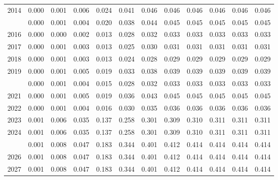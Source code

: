 \documentclass[
]{article}
\begin{document}
\begin{longtable}[t]{lrrrrrrrrrrr}
2014 & 0.000 & 0.001 & 0.006 & 0.024 & 0.041 & 0.046 & 0.046 & 0.046 & 0.046 & 0.046 & 0.046\\
\addlinespace
2015 & 0.000 & 0.001 & 0.004 & 0.020 & 0.038 & 0.044 & 0.045 & 0.045 & 0.045 & 0.045 & 0.045\\
2016 & 0.000 & 0.000 & 0.002 & 0.013 & 0.028 & 0.032 & 0.033 & 0.033 & 0.033 & 0.033 & 0.033\\
2017 & 0.000 & 0.001 & 0.003 & 0.013 & 0.025 & 0.030 & 0.031 & 0.031 & 0.031 & 0.031 & 0.031\\
2018 & 0.000 & 0.001 & 0.003 & 0.013 & 0.024 & 0.028 & 0.029 & 0.029 & 0.029 & 0.029 & 0.029\\
2019 & 0.000 & 0.001 & 0.005 & 0.019 & 0.033 & 0.038 & 0.039 & 0.039 & 0.039 & 0.039 & 0.039\\
\addlinespace
2020 & 0.000 & 0.001 & 0.004 & 0.015 & 0.028 & 0.032 & 0.033 & 0.033 & 0.033 & 0.033 & 0.033\\
2021 & 0.000 & 0.001 & 0.005 & 0.019 & 0.036 & 0.043 & 0.045 & 0.045 & 0.045 & 0.045 & 0.045\\
2022 & 0.000 & 0.001 & 0.004 & 0.016 & 0.030 & 0.035 & 0.036 & 0.036 & 0.036 & 0.036 & 0.036\\
2023 & 0.001 & 0.006 & 0.035 & 0.137 & 0.258 & 0.301 & 0.309 & 0.310 & 0.311 & 0.311 & 0.311\\
2024 & 0.001 & 0.006 & 0.035 & 0.137 & 0.258 & 0.301 & 0.309 & 0.310 & 0.311 & 0.311 & 0.311\\
\addlinespace
2025 & 0.001 & 0.008 & 0.047 & 0.183 & 0.344 & 0.401 & 0.412 & 0.414 & 0.414 & 0.414 & 0.414\\
2026 & 0.001 & 0.008 & 0.047 & 0.183 & 0.344 & 0.401 & 0.412 & 0.414 & 0.414 & 0.414 & 0.414\\
2027 & 0.001 & 0.008 & 0.047 & 0.183 & 0.344 & 0.401 & 0.412 & 0.414 & 0.414 & 0.414 & 0.414\\*
\end{longtable}
\end{document}
